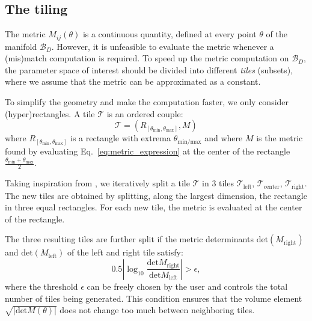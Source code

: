 \documentclass[twocolumn,showpacs,preprintnumbers,nofootinbib,prd,
superscriptaddress,10pt]{revtex4-2}
\begin{document}
\subsection{The tiling} \label{sec:tiling}

The metric $M_{ij}(\theta)$ is a continuous quantity, defined at every point $\theta$ of the manifold $\mathcal{B}_D$.
However, it is unfeasible to evaluate the metric whenever a (mis)match computation is required.
To speed up the metric computation on $\mathcal{B}_D$, the parameter space of interest should be divided into different {\it tiles} (subsets), where we assume that the metric can be approximated as a constant.

To simplify the geometry and make the computation faster, we only consider (hyper)rectangles. A tile $\mathcal{T}$ is an ordered couple:
\begin{equation} \label{eq:tile}
	\mathcal{T} = \left(R_{[\theta_\text{min}, \theta_\text{max}]}, M \right)
\end{equation}
where $R_{[\theta_\text{min}, \theta_\text{max}]}$ is a rectangle with extrema $\theta_{\text{min/max}}$ and where $M$ is the metric found by evaluating Eq.~\eqref{eq:metric_expression} at the center of the rectangle $\frac{\theta_\text{min}+\theta_\text{max}}{2}$.


Taking inspiration from \cite{Hanna:2022zpk}, we iteratively split a tile $\mathcal{T}$ in 3 tiles $\mathcal{T}_\text{left}$, $\mathcal{T}_\text{center}$, $\mathcal{T}_\text{right}$. The new tiles are obtained by splitting, along the largest dimension, the rectangle in three equal rectangles. For each new tile, the metric is evaluated at the center of the rectangle.

The three resulting tiles are further split if the metric determinants $\text{det}\left(M_\text{right}\right)$ and $\text{det}\left(M_\text{left}\right)$ of the left and right tile satisfy:
\begin{equation}\label{eq:stop_tiling}
	0.5\left|\log_{\textrm{10}}\frac{\text{det} M_\text{right}}{\text{det}M_\text{left}}\right| > \epsilon,
\end{equation}
where the threshold $\epsilon$ can be freely chosen by the user and controls the total number of tiles being generated.
This condition ensures that the volume element $\sqrt{|\text{det}M(\theta)|}$ does not change too much between neighboring tiles.
\end{document}
